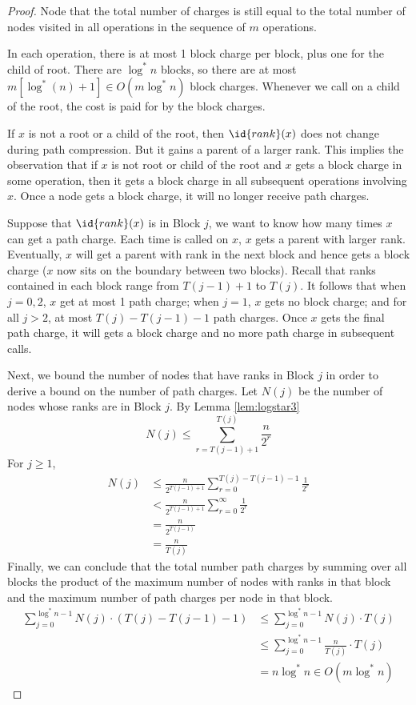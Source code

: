 \begin{proof}
    Node that the total number of charges is still equal to the total number of nodes visited in all  operations in the sequence of $m$ operations.

    In each  operation, there is at most 1 block charge per block, plus one for the child of root. There are $\log^* n$ blocks, so there are at most $m[\log^*(n) + 1] \in O(m \log^* n)$ block charges. Whenever we call  on a child of the root, the cost is paid for by the block charges.

    If $x$ is not a root or a child of the root, then $\id{rank}(x)$ does not change during path compression. But it gains a parent of a larger rank. This implies the observation that if $x$ is not root or child of the root and $x$ gets a block charge in some  operation, then it gets a block charge in all subsequent  operations involving $x$. Once a node gets a block charge, it will no longer receive path charges.

    Suppose that $\id{rank}(x)$ is in Block $j$, we want to know how many times $x$ can get a path charge. Each time  is called on $x$, $x$ gets a parent with larger rank. Eventually, $x$ will get a parent with rank in the next block and hence gets a block charge ($x$ now sits on the boundary between two blocks). Recall that ranks contained in each block range from $T(j-1)+1$ to $T(j)$. It follows that when $j=0,2$, $x$ get at most 1 path charge; when $j=1$, $x$ gets no block charge; and for all $j > 2$, at most $T(j)-T(j-1)-1$ path charges. Once $x$ gets the final path charge, it will gets a block charge and no more path charge in subsequent calls. 

    Next, we bound the number of nodes that have ranks in Block $j$ in order to derive a bound on the number of path charges. Let $N(j)$ be the number of nodes whose ranks are in Block $j$. By Lemma \ref{lem:logstar3}
    $$
    N(j) \leq \sum_{r=T(j-1)+1}^{T(j)} \frac{n}{2^r}
    $$
    For $j \geq 1$,
    $$
    \begin{aligned}
        N(j) &\leq \frac{n}{2^{T(j-1)+1}} \sum_{r=0}^{T(j)-T(j-1)-1} \frac{1}{2^r} \\
        &< \frac{n}{2^{T(j-1)+1}} \sum_{r=0}^\infty \frac{1}{2^r} \\
        &= \frac{n}{2^{T(j-1)}} \\
        &= \frac{n}{T(j)}
    \end{aligned}
    $$
    Finally, we can conclude that the total number path charges by summing over all blocks the product of the maximum number of nodes with ranks in that block and the maximum number of path charges per node in that block.
    $$
    \begin{aligned}
        \sum_{j=0}^{\log^* n - 1} N(j) \cdot (T(j)-T(j-1)-1) &\leq \sum_{j=0}^{\log^* n - 1} N(j) \cdot T(j) \\
        &\leq \sum_{j=0}^{\log^* n - 1} \frac{n}{T(j)} \cdot T(j) \\
        &= n \log^* n \in O(m \log^* n)
    \end{aligned}
    $$
\end{proof}

